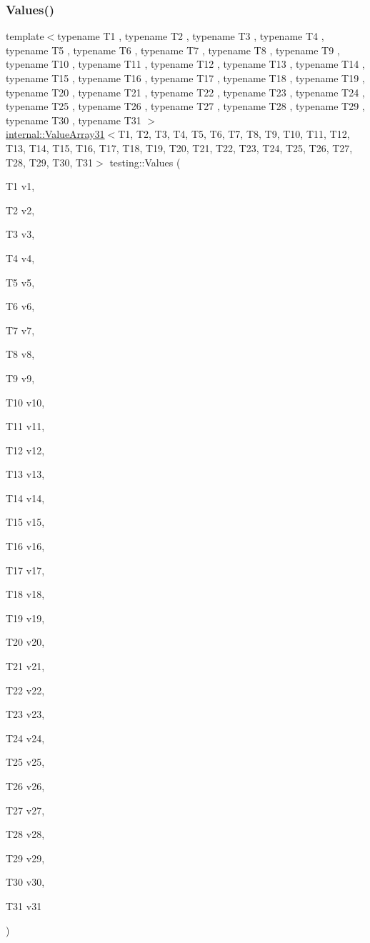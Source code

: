 \mbox{\label{namespacetesting_a40d9696e1754455c8329a866c17ed7bb}} 
\subsubsection{\texorpdfstring{Values()}{Values()}\hspace{0.1cm}{\footnotesize\ttfamily [32/51]}}
{\footnotesize\ttfamily template$<$typename T1 , typename T2 , typename T3 , typename T4 , typename T5 , typename T6 , typename T7 , typename T8 , typename T9 , typename T10 , typename T11 , typename T12 , typename T13 , typename T14 , typename T15 , typename T16 , typename T17 , typename T18 , typename T19 , typename T20 , typename T21 , typename T22 , typename T23 , typename T24 , typename T25 , typename T26 , typename T27 , typename T28 , typename T29 , typename T30 , typename T31 $>$ \\
\mbox{\hyperlink{classtesting_1_1internal_1_1_value_array31}{internal\+::\+Value\+Array31}}$<$T1, T2, T3, T4, T5, T6, T7, T8, T9, T10, T11, T12, T13, T14, T15, T16, T17, T18, T19, T20, T21, T22, T23, T24, T25, T26, T27, T28, T29, T30, T31$>$ testing\+::\+Values (\begin{DoxyParamCaption}\item[{T1}]{v1,  }\item[{T2}]{v2,  }\item[{T3}]{v3,  }\item[{T4}]{v4,  }\item[{T5}]{v5,  }\item[{T6}]{v6,  }\item[{T7}]{v7,  }\item[{T8}]{v8,  }\item[{T9}]{v9,  }\item[{T10}]{v10,  }\item[{T11}]{v11,  }\item[{T12}]{v12,  }\item[{T13}]{v13,  }\item[{T14}]{v14,  }\item[{T15}]{v15,  }\item[{T16}]{v16,  }\item[{T17}]{v17,  }\item[{T18}]{v18,  }\item[{T19}]{v19,  }\item[{T20}]{v20,  }\item[{T21}]{v21,  }\item[{T22}]{v22,  }\item[{T23}]{v23,  }\item[{T24}]{v24,  }\item[{T25}]{v25,  }\item[{T26}]{v26,  }\item[{T27}]{v27,  }\item[{T28}]{v28,  }\item[{T29}]{v29,  }\item[{T30}]{v30,  }\item[{T31}]{v31 }\end{DoxyParamCaption})}

